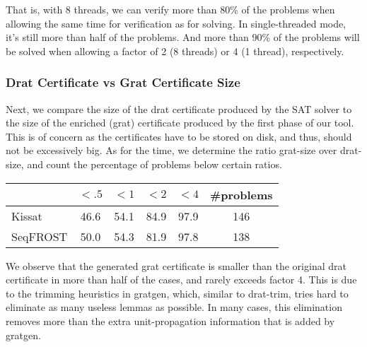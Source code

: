 \documentclass[conference]{IEEEtran}
\begin{document}
  That is, with 8 threads, we can verify more than 80\% of the problems when allowing the same time for verification as for solving. In single-threaded mode, it's still more than half of the problems. And more than 90\% of the problems will be solved when allowing a factor of 2 (8 threads) or 4 (1 thread), respectively.

  \subsubsection{Drat Certificate vs Grat Certificate Size}
  Next, we compare the size of the drat certificate produced by the SAT solver to the size of the enriched (grat) certificate produced by the first phase of our tool. This is of concern as the certificates have to be stored on disk, and thus, should not be excessively big. As for the time, we determine the ratio grat-size over drat-size, and count the percentage of problems below certain ratios.

  {\vspace{1em}
  \begin{tabular}{|l|c|c|c|c|c|}\hline
                & $<.5$ & $<1$ & $<2$ & $<4$ & \#problems\\
    \hline\hline
    Kissat      & 46.6 & 54.1 & 84.9 & 97.9 & 146\\
    SeqFROST    & 50.0 & 54.3 & 81.9 & 97.8 & 138\\
    \hline
  \end{tabular}
  \vspace{1em}
  }

  We observe that the generated grat certificate is smaller than the original drat certificate in more than half of the cases, and rarely exceeds factor 4.
  This is due to the trimming heuristics in gratgen, which, similar to drat-trim, tries hard to eliminate as many useless lemmas as possible.
  In many cases, this elimination removes more than the extra unit-propagation information that is added by gratgen.

\end{document}
